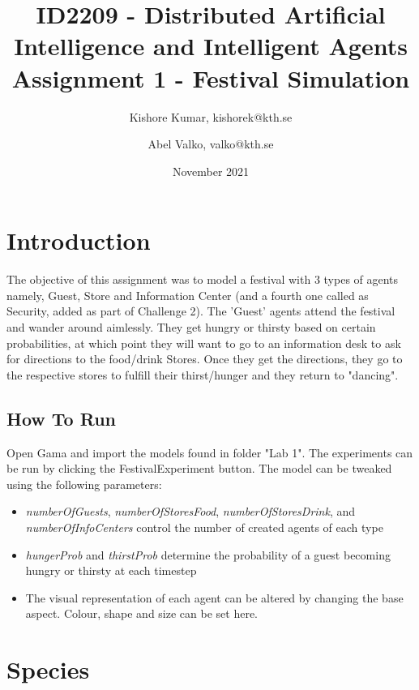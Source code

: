 \documentclass[a4paper]{article}
\title{ID2209 - Distributed Artificial Intelligence and Intelligent Agents Assignment 1 - Festival Simulation}
\author{Kishore Kumar, kishorek@kth.se \and Abel Valko, valko@kth.se}
\date{November 2021}
\begin{document}
\maketitle

\section{Introduction}
The objective of this assignment was to model a festival with 3 types of agents namely, Guest, Store and Information Center (and a fourth one called as Security, added as part of Challenge 2). The 'Guest' agents attend the festival and wander around aimlessly. They get hungry or thirsty based on certain probabilities, at which point they will want to go to an information desk to ask for directions to the food/drink Stores. Once they get the directions, they go to the respective stores to fulfill their thirst/hunger and they return to "dancing". 

\subsection{How To Run}
Open Gama and import the models found in folder "Lab 1". The experiments can be run by clicking the FestivalExperiment button. The model can be tweaked using the following parameters:
\begin{itemize}
    \item \textit{numberOfGuests}, \textit{numberOfStoresFood}, \textit{numberOfStoresDrink}, and \textit{numberOfInfoCenters} control the number of created agents of each type
    \item \textit{hungerProb} and \textit{thirstProb} determine the probability of a guest becoming hungry or thirsty at each timestep
    \item The visual representation of each agent can be altered by changing the base aspect. Colour, shape and size can be set here.
\end{itemize}

\section{Species}
\end{document}
